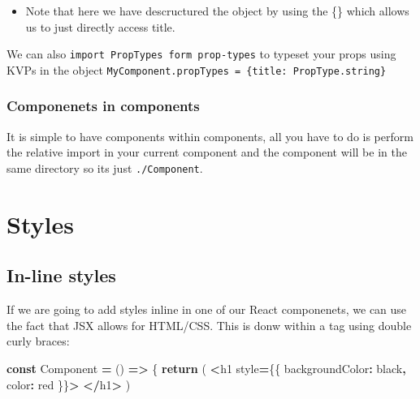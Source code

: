 \documentclass[
]{report}
\newenvironment{Shaded}{\begin{snugshade}}{\end{snugshade}}
\newcommand{\ControlFlowTok}[1]{\textcolor[rgb]{0.13,0.29,0.53}{\textbf{#1}}}
\newcommand{\DataTypeTok}[1]{\textcolor[rgb]{0.13,0.29,0.53}{#1}}
\newcommand{\KeywordTok}[1]{\textcolor[rgb]{0.13,0.29,0.53}{\textbf{#1}}}
\newcommand{\NormalTok}[1]{#1}
\newcommand{\OperatorTok}[1]{\textcolor[rgb]{0.81,0.36,0.00}{\textbf{#1}}}
\newcommand{\StringTok}[1]{\textcolor[rgb]{0.31,0.60,0.02}{#1}}
\providecommand{\tightlist}{%
  \setlength{\itemsep}{0pt}\setlength{\parskip}{0pt}}
\begin{document}
\begin{itemize}
\tightlist
\item
  Note that here we have descructured the object by using the \{\} which allows us to just directly access title.
\end{itemize}

We can also \texttt{import\ PropTypes\ form\ \textquotesingle{}prop-types\textquotesingle{}} to typeset your props using KVPs in the object \texttt{MyComponent.propTypes\ =\ \{title:\ PropType.string\}}

\hypertarget{componenets-in-components}{%
\subsection{Componenets in components}\label{componenets-in-components}}

It is simple to have components within components, all you have to do is
perform the relative import in your current component and the component will be
in the same directory so its just \texttt{\textquotesingle{}./Component}.

\hypertarget{styles}{%
\chapter{Styles}\label{styles}}

\hypertarget{in-line-styles}{%
\section{In-line styles}\label{in-line-styles}}

If we are going to add styles inline in one of our React componenets, we can use the fact that JSX allows for HTML/CSS. This is donw within a tag using double curly braces:

\begin{Shaded}
\begin{Highlighting}[]
\KeywordTok{const}\NormalTok{ Component }\OperatorTok{=}\NormalTok{ () }\KeywordTok{=\textgreater{}}\NormalTok{ \{}
    \ControlFlowTok{return}\NormalTok{ (}
        \OperatorTok{\textless{}}\NormalTok{h1 style}\OperatorTok{=}\NormalTok{\{\{ }\DataTypeTok{backgroundColor}\OperatorTok{:} \StringTok{\textquotesingle{}black\textquotesingle{}}\OperatorTok{,} \DataTypeTok{color}\OperatorTok{:} \StringTok{\textquotesingle{}red\textquotesingle{}}\NormalTok{ \}\}}\OperatorTok{\textgreater{}}
        \OperatorTok{\textless{}/}\NormalTok{h1}\OperatorTok{\textgreater{}}
\NormalTok{    )}
\end{Highlighting}
\end{Shaded}
\end{document}
